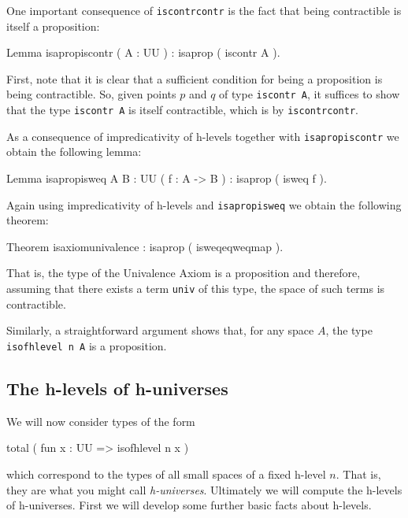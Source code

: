 One important consequence of \verb|iscontrcontr| is the fact that
being contractible is itself a proposition:
\begin{center}
  \begin{coqcode}
Lemma isapropiscontr ( A : UU ) : isaprop ( iscontr A ).
  \end{coqcode}
\end{center}
First, note that it is clear that a sufficient condition for being a
proposition is being contractible.  So, given points $p$ and $q$ of
type \verb|iscontr A|, it suffices to show that the type 
\verb|iscontr A| is itself contractible, which is by
\verb|iscontrcontr|.

As a consequence of impredicativity of h-levels together with
\verb|isapropiscontr| we obtain the following lemma:
\begin{center}
  \begin{coqcode}
Lemma isapropisweq { A B : UU } ( f : A -> B ) : isaprop ( isweq f ).
  \end{coqcode}
\end{center}
Again using impredicativity of h-levels and \verb|isapropisweq|
we obtain the following theorem:
\begin{center}
  \begin{coqcode}
Theorem isaxiomunivalence : isaprop ( isweqeqweqmap ).
  \end{coqcode}
\end{center}
That is, the type of the Univalence Axiom is a proposition and
therefore, assuming that there exists a term \verb|univ| of this
type, the space of such terms is contractible.

Similarly, a straightforward argument shows that, for any space $A$,
the type \verb|isofhlevel n A| is a proposition.

\subsection{The h-levels of h-universes}

We will now consider types of the form
\begin{center}
  \begin{coqcode}
total ( fun x : UU => isofhlevel n x )
  \end{coqcode}
\end{center}
which correspond to the types of all small spaces of a fixed
h-level $n$.  That is, they are what you might call
\emph{h-universes}.  Ultimately we will compute the h-levels of
h-universes.  First we will develop some further basic facts
about h-levels.

